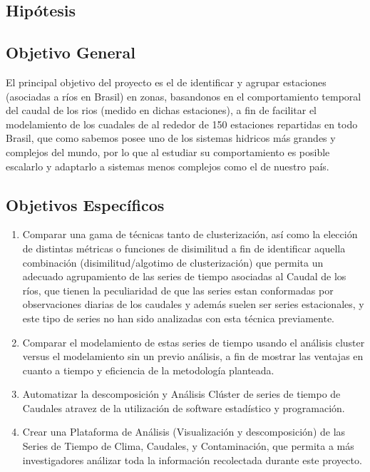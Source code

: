 \documentclass[10pt,a4paper]{article}
\begin{document}
\subsection{Hipótesis}


\subsection{Objetivo General}
El principal objetivo del proyecto es el de identificar y agrupar estaciones (asociadas a ríos en Brasil) en zonas, basandonos en el comportamiento temporal del caudal de los rios (medido en dichas estaciones), a fin de facilitar el modelamiento de los cuadales de al rededor de 150 estaciones repartidas en todo Brasil, que como sabemos posee uno de los sistemas hidricos más grandes y complejos del mundo, por lo que al estudiar su comportamiento es posible escalarlo y adaptarlo a sistemas menos complejos como el de nuestro país.

\subsection{Objetivos Específicos}
\begin{enumerate}

\item Comparar una gama de técnicas tanto de clusterización, así como la elección de distintas métricas o funciones de disimilitud a fin de identificar aquella combinación (disimilitud/algotimo de clusterización) que permita un adecuado agrupamiento de las series de tiempo asociadas al Caudal de los ríos, que tienen la peculiaridad de que las series estan conformadas por observaciones diarias de los caudales y además suelen ser series estacionales, y este tipo de series no han sido analizadas con esta técnica previamente.

\item Comparar el modelamiento de estas series de tiempo usando el análisis cluster versus el modelamiento sin un previo análisis, a fin de mostrar las ventajas en cuanto a tiempo y eficiencia de la metodología planteada.

\item Automatizar la descomposición y Análisis Clúster de series de tiempo de Caudales atravez de la utilización de software estadístico y programación.

\item Crear una Plataforma de Análisis (Visualización y descomposición) de las Series de Tiempo de Clima, Caudales, y Contaminación, que permita a más investigadores análizar toda la información recolectada durante este proyecto.

\end{enumerate}
\end{document}
